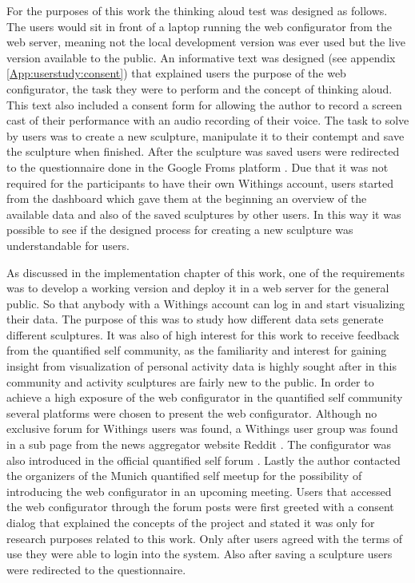 \documentclass[../medieninformatik-arbeit.tex]{subfiles}
\begin{document}
For the purposes of this work the thinking aloud test was designed as follows. The users would sit in front of a laptop running the web configurator from the web server, meaning not the local development version was ever used but the live version available to the public. An informative text was designed (see appendix \ref{App:userstudy:consent}) that explained users the purpose of the web configurator, the task they were to perform and the concept of thinking aloud. This text also included a consent form for allowing the author to record a screen cast of their performance with an audio recording of their voice. The task to solve by users was to create a new sculpture, manipulate it to their contempt and save the sculpture when finished. After the sculpture was saved users were redirected to the questionnaire done in the Google Froms platform \cite{googleforms}. Due that it was not required for the participants to have their own Withings account, users started from the dashboard which gave them at the beginning an overview of the available data and also of the saved sculptures by other users. In this way it was possible to see if the designed process for creating a new sculpture was understandable for users. 

As discussed in the implementation chapter of this work, one of the requirements was to develop a working version and deploy it in a web server for the general public. So that anybody with a Withings account can log in and start visualizing their data. The purpose of this was to study how different data sets generate different sculptures. It was also of high interest for this work to receive feedback from the quantified self community, as the familiarity and interest for gaining insight from visualization of personal activity data is highly sought after in this community and activity sculptures are fairly new to the public. In order to achieve a high exposure of the web configurator in the quantified self community several platforms were chosen to present the web configurator. Although no exclusive forum for Withings users was found, a Withings user group was found in a sub page from the news aggregator website Reddit \cite{redditwithings}. The configurator was also introduced in the official quantified self forum \cite{qfselfforum}. Lastly the author contacted the organizers of the Munich quantified self meetup \cite{qfselfmeetup} for the possibility of introducing the web configurator in an upcoming meeting. Users that accessed the web configurator through the forum posts were first greeted with a consent dialog that explained the concepts of the project and stated it was only for research purposes related to this work. Only after users agreed with the terms of use they were able to login into the system. Also after saving a sculpture users were redirected to the questionnaire. 
\end{document}

